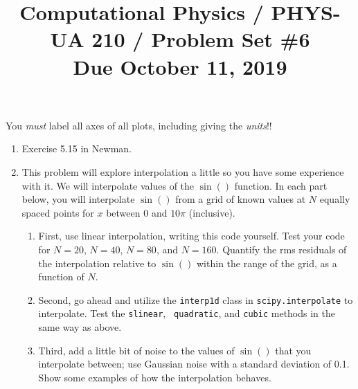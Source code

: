 \documentclass[11pt, preprint]{aastex}
\begin{document}
\title{\bf Computational Physics / PHYS-UA 210 / Problem Set \#6
\\ Due October 11, 2019 }

You {\it must} label all axes of all plots, including giving the {\it
  units}!!

\begin{enumerate}
\item Exercise 5.15 in Newman.
\item This problem will explore interpolation a little so you have
  some experience with it. We will interpolate values of the $\sin()$
  function. In each part below, you will interpolate $\sin()$ from a
  grid of known values at $N$ equally spaced points for $x$ between
  $0$ and $10\pi$ (inclusive).
\begin{enumerate}
\item First, use linear interpolation, writing this code
  yourself. Test your code for $N=20$, $N=40$, $N=80$, and
  $N=160$. Quantify the rms residuals of the interpolation relative to
  $\sin()$ within the range of the grid, as a function of $N$.
\item Second, go ahead and utilize the {\tt interp1d} class in
  {\tt scipy.interpolate} to interpolate. Test the {\tt slinear}, {\tt
    quadratic}, and {\tt cubic} methods in the same way as above.
\item Third, add a little bit of noise to the values of $\sin()$ that
  you interpolate between; use Gaussian noise with a standard
  deviation of 0.1. Show some examples of how the interpolation
  behaves.
\end{enumerate}
  
\end{enumerate}
\end{document}
